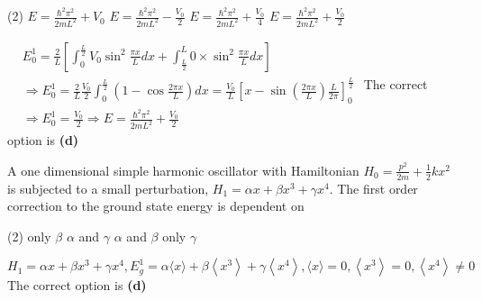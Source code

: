 \begin{enumerate}
\begin{minipage}{\textwidth}
\begin{figure}[H]
		\end{figure}
	\end{minipage}
	\begin{tasks}(2)
		\task[\textbf{A.}] $E=\frac{\hbar^{2} \pi^{2}}{2 m L^{2}}+V_{0}$
		\task[\textbf{B.}]$E=\frac{\hbar^{2} \pi^{2}}{2 m L^{2}}-\frac{V_{0}}{2}$
		\task[\textbf{C.}] $E=\frac{\hbar^{2} \pi^{2}}{2 m L^{2}}+\frac{V_{0}}{4}$
		\task[\textbf{D.}]$E=\frac{\hbar^{2} \pi^{2}}{2 m L^{2}}+\frac{V_{0}}{2}$
	\end{tasks}
	\begin{answer}
		$\begin{aligned}
		&E_{0}^{1}=\frac{2}{L}\left[\int_{0}^{\frac{L}{2}} V_{0} \sin ^{2} \frac{\pi x}{L} d x+\int_{\frac{L}{2}}^{L} 0 \times \sin ^{2} \frac{\pi x}{L} d x\right] \\
		&\Rightarrow E_{0}^{1}=\frac{2}{L} \frac{V_{0}}{2} \int_{0}^{\frac{L}{2}}\left(1-\cos \frac{2 \pi x}{L}\right) d x=\frac{V_{0}}{L}\left[x-\sin \left(\frac{2 \pi x}{L}\right) \frac{L}{2 \pi}\right]_{0}^{\frac{L}{2}} \\
		&\Rightarrow E_{0}^{1}=\frac{V_{0}}{2} \Rightarrow E=\frac{\hbar^{2} \pi^{2}}{2 m L^{2}}+\frac{V_{0}}{2}
		\end{aligned}$
		The correct option is \textbf{(d)}	
	\end{answer}
	\begin{minipage}{\textwidth}
		\item A one dimensional simple harmonic oscillator with Hamiltonian $H_{0}=\frac{p^{2}}{2 m}+\frac{1}{2} k x^{2}$ is subjected to a small perturbation, $H_{1}=\alpha x+\beta x^{3}+\gamma x^{4}$. The first order correction to the ground state energy is dependent on
	\end{minipage}
	\begin{tasks}(2)
		\task[\textbf{A.}] only $\beta$
		\task[\textbf{B.}]$\alpha$ and $\gamma$
		\task[\textbf{C.}]$\alpha$ and $\beta$
		\task[\textbf{D.}]only $\gamma$
	\end{tasks}
	\begin{answer}
		$H_{1}=\alpha x+\beta x^{3}+\gamma x^{4}, E_{g}^{1}=\alpha\langle x\rangle+\beta\left\langle x^{3}\right\rangle+\gamma\left\langle x^{4}\right\rangle,\langle x\rangle=0,\left\langle x^{3}\right\rangle=0,\left\langle x^{4}\right\rangle \neq 0$\\
		The correct option is \textbf{(d)}	
	\end{answer}
	
\end{enumerate}